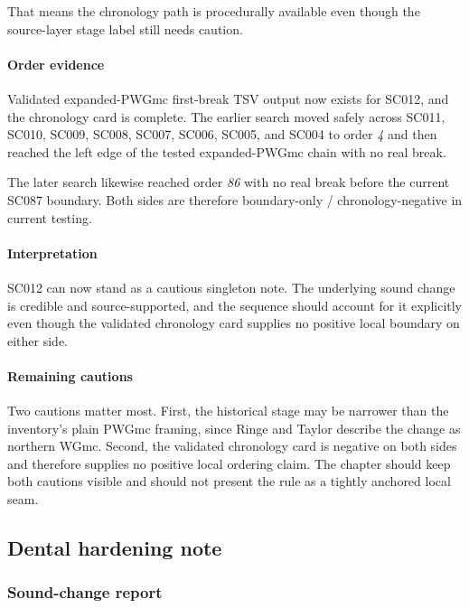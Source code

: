 \documentclass[
  british,
  a4paper,
]{article}
\begin{document}
That means the chronology path is procedurally available even though the
source-layer stage label still needs caution.

\paragraph{Order evidence}\label{order-evidence-9}

Validated expanded-PWGmc first-break TSV output now exists for SC012,
and the chronology card is complete. The earlier search moved safely
across SC011, SC010, SC009, SC008, SC007, SC006, SC005, and SC004 to
order \emph{4} and then reached the left edge of the tested
expanded-PWGmc chain with no real break.

The later search likewise reached order \emph{86} with no real break
before the current SC087 boundary. Both sides are therefore
boundary-only / chronology-negative in current testing.

\paragraph{Interpretation}\label{interpretation-9}

SC012 can now stand as a cautious singleton note. The underlying sound
change is credible and source-supported, and the sequence should account
for it explicitly even though the validated chronology card supplies no
positive local boundary on either side.

\paragraph{Remaining cautions}\label{remaining-cautions-9}

Two cautions matter most. First, the historical stage may be narrower
than the inventory's plain PWGmc framing, since Ringe and Taylor
describe the change as northern WGmc. Second, the validated chronology
card is negative on both sides and therefore supplies no positive local
ordering claim. The chapter should keep both cautions visible and should
not present the rule as a tightly anchored local seam.

\subsection{Dental hardening note}\label{dental-hardening-note}

\subsubsection{Sound-change report}\label{sound-change-report-10}
\end{document}
